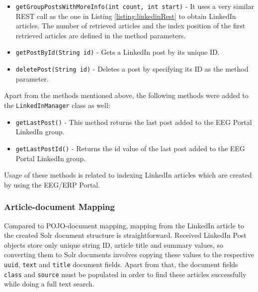 \begin{itemize}
	\item \texttt{getGroupPostsWithMoreInfo(int count, int start)} - It uses a very similar REST call as the one in Listing \ref{listing:linkedinRest} to obtain LinkedIn articles. 
	The number of retrieved articles and the index position of the first retrieved articles are defined in the method parameters. 
	\item \texttt{getPostById(String id)} - Gets a LinkedIn post by its unique ID.
	\item \texttt{deletePost(String id)} - Deletes a post by specifying its ID as the method parameter.
\end{itemize}

Apart from the methods mentioned above, the following methods were added to the \texttt{LinkedInManager} class as well:

\begin{itemize}
	\item \texttt{getLastPost()} - This method returns the last post added to the EEG Portal LinkedIn group.
	\item \texttt{getLastPostId()} - Returns the id value of the last post added to the EEG Portal LinkedIn group.
\end{itemize}

Usage of these methods is related to indexing LinkedIn articles which are created by using the EEG/ERP Portal.

\subsubsection{Article-document Mapping}

Compared to POJO-document mapping, mapping from the LinkedIn article to the created Solr document structure is straightforward.
Received LinkedIn Post objects store only unique string ID, article title and summary values, so converting them to Solr documents involves copying these values to the respective \texttt{uuid}, \texttt{text} and \texttt{title} document fields.
Apart from that, the document fields \texttt{class} and \texttt{source} must be populated in order to find these articles successfully while doing a full text search.


